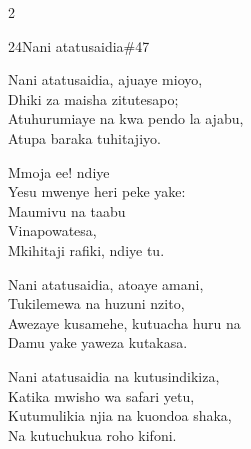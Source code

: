 \documentclass{article}
\begin{document}
\begin{multicols}{2}
\begin{hymn}{24}{Nani atatusaidia}{\#47}
\begin{stanza}
Nani atatusaidia, ajuaye mioyo,\\
Dhiki za maisha zitutesapo;\\
Atuhurumiaye na kwa pendo la ajabu,\\
Atupa baraka tuhitajiyo.
\end{stanza}
\begin{chorus}
Mmoja ee! ndiye\\
Yesu mwenye heri peke yake:\\
Maumivu na taabu\\
Vinapowatesa,\\
Mkihitaji rafiki, ndiye tu.
\end{chorus}
\begin{stanza}
Nani atatusaidia, atoaye amani,\\
Tukilemewa na huzuni nzito,\\
Awezaye kusamehe, kutuacha huru na\\
Damu yake yaweza kutakasa.
\end{stanza}
\begin{stanza}
Nani atatusaidia na kutusindikiza,\\
Katika mwisho wa safari yetu,\\
Kutumulikia njia na kuondoa shaka,\\
Na kutuchukua roho kifoni.
\end{stanza}
\end{hymn}


\end{multicols}
\end{document}
